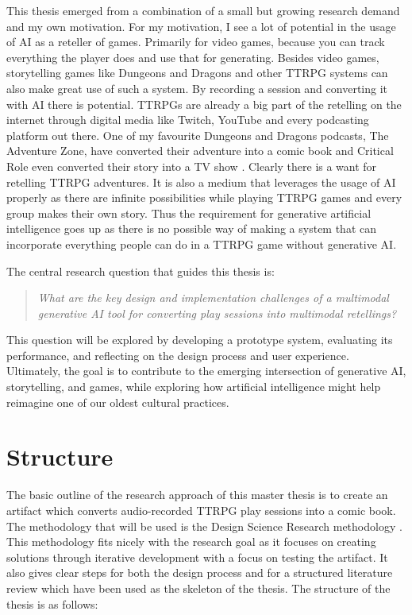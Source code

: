 This thesis emerged from a combination of a small but growing research demand \cite{Gallotta2024LLM} and my own motivation. For my motivation, I see a lot of potential in the usage of AI as a reteller of games. Primarily for video games, because you can track everything the player does and use that for generating. Besides video games, storytelling games like Dungeons and Dragons \cite{DnD5e} and other TTRPG systems can also make great use of such a system. By recording a session and converting it with AI there is potential. TTRPGs are already a big part of the retelling on the internet through digital media like Twitch, YouTube and every podcasting platform out there. One of my favourite Dungeons and Dragons podcasts, The Adventure Zone, have converted their adventure into a comic book \cite{AdventureZone2018} and Critical Role even converted their story into a TV show \cite{criticalrole_legends_vox_machina}. Clearly there is a want for retelling TTRPG adventures. It is also a medium that leverages the usage of AI properly as there are infinite possibilities while playing TTRPG games and every group makes their own story. Thus the requirement for generative artificial intelligence goes up as there is no possible way of making a system that can incorporate everything people can do in a TTRPG game without generative AI.

The central research question that guides this thesis is:

\begin{quote}
\textit{What are the key design and implementation challenges of a multimodal generative AI tool for converting play sessions into multimodal retellings?}
\end{quote}
This question will be explored by developing a prototype system, evaluating its performance, and reflecting on the design process and user experience. Ultimately, the goal is to contribute to the emerging intersection of generative AI, storytelling, and games, while exploring how artificial intelligence might help reimagine one of our oldest cultural practices.

\section{Structure} 

The basic outline of the research approach of this master thesis is to create an artifact which converts audio-recorded TTRPG play sessions into a comic book. The methodology that will be used is the Design Science Research methodology \cite{dresch2015design}. This methodology fits nicely with the research goal as it focuses on creating solutions through iterative development with a focus on testing the artifact. It also gives clear steps for both the design process and for a structured literature review which have been used as the skeleton of the thesis. The structure of the thesis is as follows:

